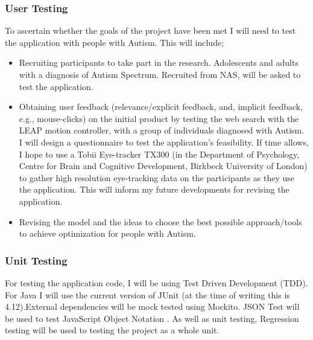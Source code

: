 \documentclass[10pt]{article}
\begin{document}
\subsubsection{User Testing}
To ascertain whether the goals of the project have been met I will need to test the application with people with Autism. This will include;
\begin{itemize}
\item Recruiting participants to take part in the research. Adolescents and adults with a diagnosis of Autism Spectrum. Recruited from NAS, will be asked to test the application.
\item Obtaining user feedback (relevance/explicit feedback, and, implicit feedback, e.g., mouse-clicks) on the initial product by testing the web search with the LEAP motion controller, with a group of individuals diagnosed with Autism. I will design a questionnaire to test the application's feasibility. If time allows, I hope to use a Tobii Eye-tracker TX300 (in the Department of Psychology, Centre for Brain and Cognitive Development, Birkbeck University of London) to gather high resolution eye-tracking data on the participants as they use the application. This will inform my future developments for revising the application.
\item Revising the model and the ideas to choose the best possible approach/tools to achieve optimization for people with Autism.
\end{itemize}

\subsubsection{Unit Testing}
For testing the application code, I will be using Test Driven Development (TDD). For Java I will use the current version of JUnit (at the time of writing this is 4.12).External dependencies will be mock tested using Mockito. JSON Test will be used to test JavaScript Object Notation \cite{jsontest}. As well as unit testing, Regression testing will be used to testing the project as a whole unit.
\end{document}
